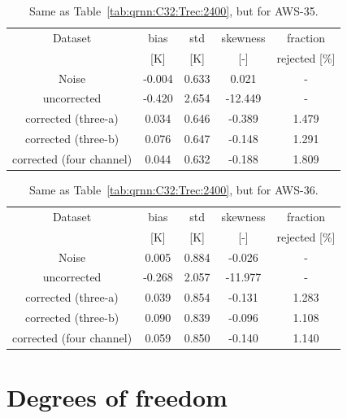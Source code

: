 \documentclass[12pt]{article}
\begin{document}
\begin{table}[!p]
	\centering
	\begin{tabular}[b]{c|c|c|c|c}
		Dataset  		  &   bias &   std &   skewness & fraction  \\
		&   [K]  &   [K] & [-] & rejected [\%]\\
		\hline
Noise                      & -0.004 & 0.633 &              0.021 &      - \\
uncorrected                & -0.420 & 2.654 &            -12.449 &      - \\
corrected (three-a) &  0.034 & 0.646 &             -0.389 &      1.479 \\
corrected (three-b) &  0.076 & 0.647 &             -0.148 &      1.291 \\
corrected (four channel)   &  0.044 & 0.632 &             -0.188 &      1.809 \\
		\hline
	\end{tabular}
	\caption{ Same as Table~\ref{tab:qrnn:C32:Trec:2400}, but for AWS-35. }
	\label{tab:qrnn:C35:Trec:2400}
\end{table}

\begin{table}[!p]
	\centering
	\begin{tabular}[b]{c|c|c|c|c}
		Dataset  		  &   bias &   std &   skewness & fraction  \\
		&   [K]  &   [K] & [-] & rejected [\%]\\
		\hline
Noise                      &  0.005 & 0.884 &             -0.026 &      - \\
uncorrected                & -0.268 & 2.057 &            -11.977 &      - \\
corrected (three-a) &  0.039 & 0.854 &             -0.131 &      1.283 \\
corrected (three-b) &  0.090 & 0.839 &             -0.096 &      1.108 \\
corrected (four channel)   &  0.059 & 0.850 &             -0.140 &      1.140 \\
		\hline
	\end{tabular}
	\caption{ Same as Table~\ref{tab:qrnn:C32:Trec:2400}, but for AWS-36.  }
	\label{tab:qrnn:C36:Trec:2400}
\end{table}

\section{Degrees of freedom}
%
\end{document}
